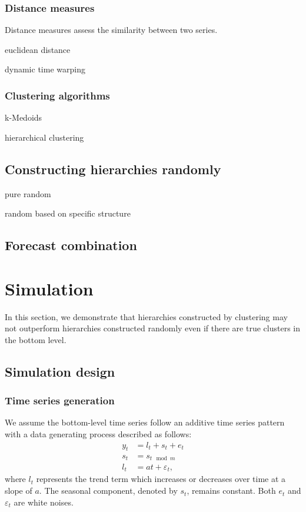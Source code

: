 \documentclass[a4paper,review,12pt,authoryear]{elsarticle}
\begin{document}
\subsubsection*{Distance measures}

Distance measures assess the similarity between two series.

euclidean distance

dynamic time warping

\subsubsection*{Clustering algorithms}
\label{sec:clustering}

k-Medoids

hierarchical clustering

\subsection{Constructing hierarchies randomly}

pure random

random based on specific structure

\subsection{Forecast combination}

\section{Simulation}
\label{sec:simulation}

In this section, we demonstrate that hierarchies constructed by clustering may not outperform hierarchies constructed randomly even if there are true clusters in the bottom level.

\subsection{Simulation design}

\subsubsection*{Time series generation}

We assume the bottom-level time series follow an additive time series pattern with a data generating process described as follows:
\begin{equation}
    \label{simu:DGP}
    \begin{aligned}
    y_t &= l_t + s_t + e_t \\
    s_t &= s_{t\mod m} \\
    l_t &= a t + \varepsilon_t,
    \end{aligned}
\end{equation}
where $l_t$ represents the trend term which increases or decreases over time at a slope of $a$. The seasonal component, denoted by $s_t$, remains constant. Both $e_t$ and $\varepsilon_t$ are white noises.
\end{document}
